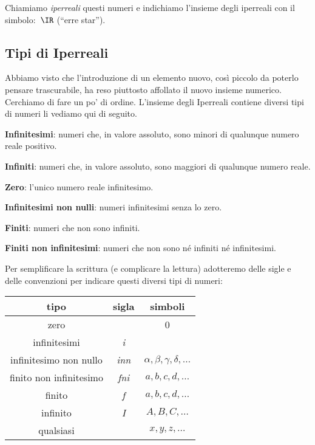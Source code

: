 Chiamiamo \emph{iperreali} questi numeri e indichiamo l'insieme degli 
iperreali con il simbolo:~\(\IR\) (``erre star'').

\subsection{Tipi di Iperreali}
\label{subsec:insnum_iperreali}

Abbiamo visto che l'introduzione di un elemento nuovo, così piccolo
da poterlo pensare trascurabile, ha reso piuttosto affollato il nuovo 
insieme numerico. 
Cerchiamo di fare un po' di ordine. 
L'insieme degli Iperreali contiene diversi tipi di numeri li vediamo qui di 
seguito.

\begin{description} [noitemsep]
 \item \textbf{Infinitesimi}:
numeri che, in valore assoluto, sono minori di qualunque numero reale 
positivo.
 \item \textbf{Infiniti}:
numeri che, in valore assoluto, sono maggiori di qualunque numero reale.
 \item \textbf{Zero}:
l'unico numero reale infinitesimo.
 \item \textbf{Infinitesimi non nulli}:
numeri infinitesimi senza lo zero.
 \item \textbf{Finiti}:
numeri che non sono infiniti.
 \item \textbf{Finiti non infinitesimi}:
numeri che non sono né infiniti né infinitesimi.
\end{description}

Per semplificare la scrittura (e complicare la lettura) adotteremo delle 
sigle e delle convenzioni per indicare questi diversi tipi di numeri:

\begin{center}
\begin{tabular}{ccc}\toprule
tipo & sigla & simboli \\\midrule

zero &  & 0 \\

infinitesimi & \emph{i} & \\

infinitesimo non nullo & \emph{inn} & 
\(\alpha, \beta, \gamma, \delta, \dots\) \\

finito non infinitesimo & \emph{fni} & \(a, b, c, d, \dots\)\\

finito & \emph{f} & \(a, b, c, d, \dots\) \\

infinito & \emph{I} & \(A, B, C, \dots\)\\

qualsiasi &  & \(x, y, z, \dots\) \\\bottomrule
\end{tabular}
\label{tab:insnum_tipi}
\end{center}

